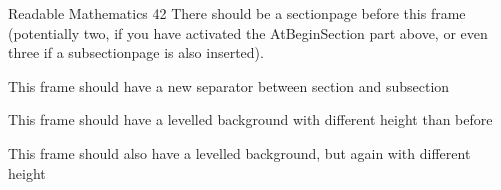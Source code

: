 \documentclass[
  10pt,
  aspectratio=169,
  xcolor={dvipsnames,table,x11names},  %
]{beamer}
\begin{document}
\begin{frame}{Readable Mathematics 42}
  There should be a sectionpage before this frame (potentially two, if you
  have activated the AtBeginSection part above, or even three if a
  subsectionpage is also inserted).
\end{frame}



\UpdateGWthemeOptions[secsubsecseparator=\GWthemeStarredbullet]

\begin{frame}
  This frame should have a new separator between section and subsection
\end{frame}


{
\LevelledBGLine{0.2\paperheight}

\begin{frame}
  This frame should have a levelled background with different height than before
\end{frame}

}


\UpdateGWthemeOptions[upperleftbg=0.06\paperheight, upperrightbg=0.06\paperheight]

\begin{frame}
  This frame should also have a levelled background, but again with different height
\end{frame}
\end{document}

